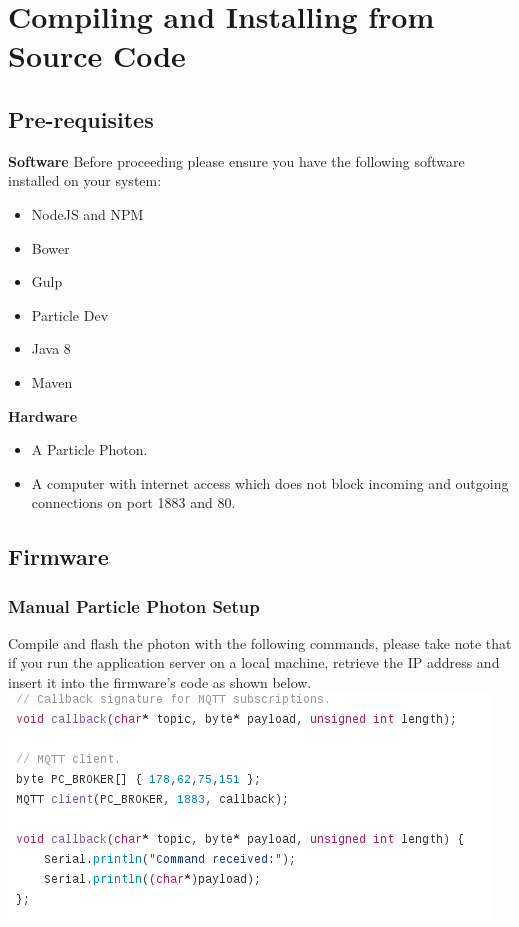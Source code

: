 \documentclass[a4paper,10pt]{article}
\begin{document}
	\section{Compiling and Installing from Source Code}
	\subsection{Pre-requisites}
	\textbf{Software}
	Before proceeding please ensure you have the following software installed on your system:
	\begin{itemize}
		\item NodeJS and NPM
		\item Bower
		\item Gulp
		\item Particle Dev
		\item Java 8
		\item Maven
	\end{itemize}
	
	\textbf{Hardware}
	\begin{itemize}
		\item A Particle Photon.
		\item A computer with internet access which does not block incoming and outgoing connections on port 1883 and 80.
	\end{itemize}
	
	\subsection{Firmware}
		\subsubsection{Manual Particle Photon Setup}
			Compile and flash the photon with the following commands, please take note 
			that if you run the application server on a local machine, retrieve the IP 
			address and insert it into the firmware's code as shown below.\\
	
			\includegraphics[scale=0.5]{images/firmware.png}
	
\end{document}
